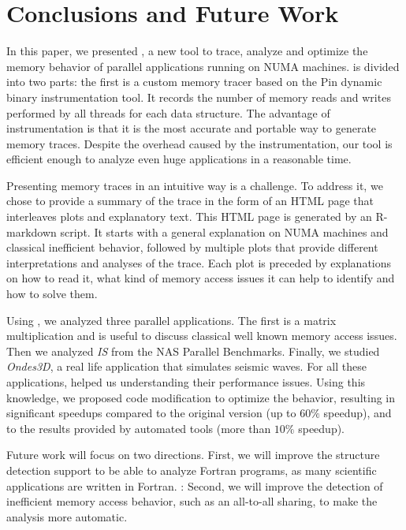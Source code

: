 
\section{Conclusions and Future Work}
\label{sec:concl}

In this paper, we presented \TABARNAC, a new tool to trace, analyze and
optimize the memory behavior of parallel applications running on NUMA
machines. \TABARNAC is divided into two parts: the first is a custom memory tracer
based on the Pin dynamic binary instrumentation tool. It records the
number of memory reads and writes performed by all threads for each data structure.
The advantage of instrumentation is that it is the most
accurate and portable way to generate memory traces.
Despite the overhead caused by the instrumentation, our tool is efficient enough to analyze even huge applications in a reasonable time.

Presenting memory traces in an intuitive way is a challenge. To address it, we
chose to provide a summary of the trace in the form of an HTML page that
interleaves plots and explanatory text. This HTML page is generated by an R-markdown
script. It starts with a general explanation on NUMA machines and classical
inefficient behavior, followed by multiple plots that provide different
interpretations and analyses of the trace. Each plot is preceded by explanations on how to
read it, what kind of memory access issues it can help to identify and how to solve them.

Using \TABARNAC, we analyzed three parallel applications. The first is a
matrix multiplication and is useful to discuss classical well known memory access issues.
Then we analyzed \emph{IS} from the NAS Parallel Benchmarks. Finally, we studied
\emph{Ondes3D}, a real life application that simulates seismic waves. For all
these applications, \TABARNAC helped us understanding their performance issues.
Using this knowledge, we proposed code modification to optimize the behavior, resulting in
significant speedups compared to the original version (up to $60\%$ speedup),
and to the results provided by automated tools (more than $10\%$ speedup).

Future work will focus on two directions. First, we will improve the
structure detection support to be able to analyze Fortran programs, as many
scientific applications are written in Fortran. : Second, we will improve the
detection of inefficient memory access behavior, such as an all-to-all
sharing, to make the analysis more automatic.
